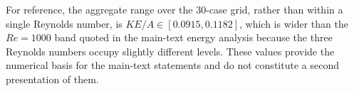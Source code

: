 \documentclass[11pt]{article}
\begin{document}
For reference, the aggregate range over the 30-case grid, rather than within
a single Reynolds number, is $KE/A\in[0.0915,0.1182]$, which is wider
than the $Re=1000$ band quoted in the main-text energy analysis because the
three Reynolds numbers occupy slightly different levels. These values provide
the numerical basis for the main-text statements and do not constitute a second
presentation of them.
\begin{table}[H]
\centering
\caption{Integrated kinetic energy $KE$ and integrated dissipation
$D=2\nu\int_{\Omega}S:S\,dA$ with $\nu=2/Re$, together with their
area-normalized counterparts on the 30-case reference grid ($N=128$).
$KE/A$ uses the exact cavity area $A(n)$; $D/A$ uses the area $A_{\rm mask}(n)$
of the discrete integration mask, so that numerator and denominator share the
same support. Absolute dissipation levels are resolution-sensitive; the table
is used only for geometry ordering at fixed resolution and observable
definition.}





\end{table}
\end{document}
